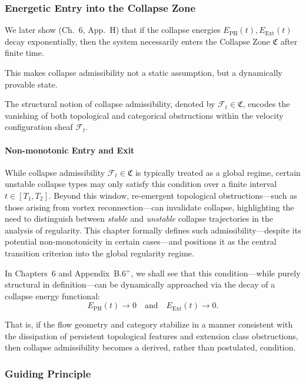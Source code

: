 \documentclass[11pt]{article}
\begin{document}
\subsubsection*{Energetic Entry into the Collapse Zone}

We later show (Ch.~6, App.~H) that if the collapse energies \( E_{\mathrm{PH}}(t), E_{\mathrm{Ext}}(t) \) decay exponentially, then the system necessarily enters the Collapse Zone \( \mathfrak{C} \) after finite time.

This makes collapse admissibility not a static assumption, but a dynamically provable state.


The structural notion of collapse admissibility, denoted by \( \mathcal{F}_t \in \mathfrak{C} \), encodes the vanishing of both topological and categorical obstructions within the velocity configuration sheaf \( \mathcal{F}_t \).
\paragraph{Non-monotonic Entry and Exit}
While collapse admissibility \( \mathcal{F}_t \in \mathfrak{C} \) is typically treated as a global regime, certain unstable collapse types may only satisfy this condition over a finite interval \( t \in [T_1, T_2] \). Beyond this window, re-emergent topological obstructions—such as those arising from vortex reconnection—can invalidate collapse, highlighting the need to distinguish between \emph{stable} and \emph{unstable} collapse trajectories in the analysis of regularity.
This chapter formally defines such admissibility—despite its potential non-monotonicity in certain cases—and positions it as the central transition criterion into the global regularity regime.

In Chapters~6 and Appendix~B.6$^{+}$, we shall see that this condition—while purely structural in definition—can be dynamically approached via the decay of a collapse energy functional:
\[
E_{\mathrm{PH}}(t) \to 0 \quad \text{and} \quad E_{\mathrm{Ext}}(t) \to 0.
\]

That is, if the flow geometry and category stabilize in a manner consistent with the dissipation of persistent topological features and extension class obstructions, then collapse admissibility becomes a derived, rather than postulated, condition.

\subsubsection*{Guiding Principle}
\end{document}
